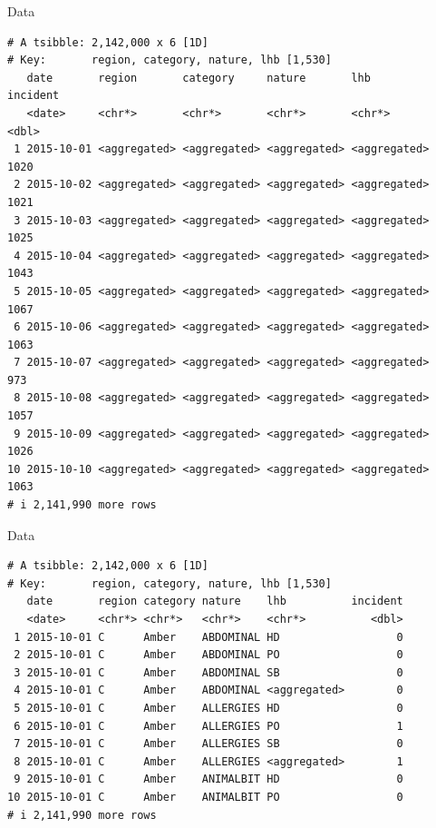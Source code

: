 \documentclass[
  14pt,
  ignorenonframetext,
  aspectratio=169,
]{beamer}
\begin{document}
\begin{frame}[fragile]{Data}
\label{data-1}
\fontsize{10}{10}\sf

\begin{verbatim}
# A tsibble: 2,142,000 x 6 [1D]
# Key:       region, category, nature, lhb [1,530]
   date       region       category     nature       lhb          incident
   <date>     <chr*>       <chr*>       <chr*>       <chr*>          <dbl>
 1 2015-10-01 <aggregated> <aggregated> <aggregated> <aggregated>     1020
 2 2015-10-02 <aggregated> <aggregated> <aggregated> <aggregated>     1021
 3 2015-10-03 <aggregated> <aggregated> <aggregated> <aggregated>     1025
 4 2015-10-04 <aggregated> <aggregated> <aggregated> <aggregated>     1043
 5 2015-10-05 <aggregated> <aggregated> <aggregated> <aggregated>     1067
 6 2015-10-06 <aggregated> <aggregated> <aggregated> <aggregated>     1063
 7 2015-10-07 <aggregated> <aggregated> <aggregated> <aggregated>      973
 8 2015-10-08 <aggregated> <aggregated> <aggregated> <aggregated>     1057
 9 2015-10-09 <aggregated> <aggregated> <aggregated> <aggregated>     1026
10 2015-10-10 <aggregated> <aggregated> <aggregated> <aggregated>     1063
# i 2,141,990 more rows
\end{verbatim}
\end{frame}

\begin{frame}[fragile]{Data}
\label{data-2}
\fontsize{10}{10}\sf

\begin{verbatim}
# A tsibble: 2,142,000 x 6 [1D]
# Key:       region, category, nature, lhb [1,530]
   date       region category nature    lhb          incident
   <date>     <chr*> <chr*>   <chr*>    <chr*>          <dbl>
 1 2015-10-01 C      Amber    ABDOMINAL HD                  0
 2 2015-10-01 C      Amber    ABDOMINAL PO                  0
 3 2015-10-01 C      Amber    ABDOMINAL SB                  0
 4 2015-10-01 C      Amber    ABDOMINAL <aggregated>        0
 5 2015-10-01 C      Amber    ALLERGIES HD                  0
 6 2015-10-01 C      Amber    ALLERGIES PO                  1
 7 2015-10-01 C      Amber    ALLERGIES SB                  0
 8 2015-10-01 C      Amber    ALLERGIES <aggregated>        1
 9 2015-10-01 C      Amber    ANIMALBIT HD                  0
10 2015-10-01 C      Amber    ANIMALBIT PO                  0
# i 2,141,990 more rows
\end{verbatim}
\end{frame}
\end{document}

